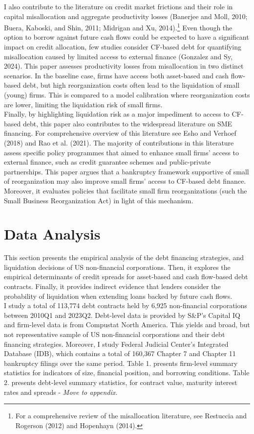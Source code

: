 \documentclass[12pt]{article}
\begin{document}
I also contribute to the literature on credit market frictions and their role in capital misallocation and aggregate productivity losses (Banerjee and Moll, 2010; Buera, Kaboski, and Shin, 2011; Midrigan and Xu, 2014).\footnote{For a comprehensive review of the misallocation literature, see Restuccia and Rogerson (2012) and Hopenhayn (2014).} Even though the option to borrow against future cash flows could be expected to have a significant impact on credit allocation, few studies consider CF-based debt for quantifying misallocation caused by limited access to external finance (Gonzalez and Sy, 2024). This paper assesses productivity losses from misallocation in two distinct scenarios. In the baseline case, firms have access both asset-based and cash flow-based debt, but high reorganization costs often lead to the liquidation of small (young) firms. This is compared to a model calibration where reorganization costs are lower, limiting the liquidation risk of small firms. \vspace{3mm} \\
Finally, by highlighting liquidation risk as a major impediment to access to CF-based debt, this paper also contributes to the widespread literature on SME financing. For comprehensive overview of this literature see Esho and Verhoef (2018) and Rao et al. (2021). The majority of contributions in this literature assess specific policy programmes that aimed to enhance small firms' access to external finance, such as credit guarantee schemes and public-private partnerships. This paper argues that a bankruptcy framework supportive of small of reorganization may also improve small firms' access to CF-based debt finance. Moreover, it evaluates policies that facilitate small firm reorganizations (such the Small Business Reorganization Act) in light of this mechanism. 

\section{Data Analysis \label{sec:empirical analysis}}
This section presents the empirical analysis of the debt financing strategies, and liquidation decisions of US non-financial corporations. Then, it explores the empirical determinants of credit spreads for asset-based and cash flow-based debt contracts. Finally, it provides indirect evidence that lenders consider the probability of liquidation when extending loans backed by future cash flows. \vspace{3mm} \\
I study a total of 113,774 debt contracts held by 6,925 non-financial corporations between 2010Q1 and 2023Q2. Debt-level data is provided by S\&P's Capital IQ and firm-level data is from Compustat North America. This yields and broad, but not representative sample of US non-financial corporations and their debt financing strategies. Moreover, I study Federal Judicial Center's Integrated Database (IDB), which contains a total of 160,367 Chapter 7 and Chapter 11 bankruptcy filings over the same period. Table 1. presents firm-level summary statistics for indicators of size, financial position, and borrowing conditions. Table 2. presents debt-level summary statistics, for contract value, maturity interest rates and spreads - \textit{Move to appendix.}
\end{document}
